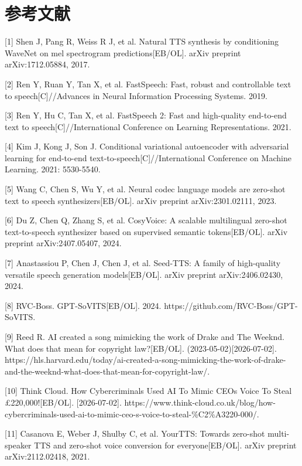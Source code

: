 \chapter*{参考文献}
\begin{referencesblock}
{[}1{]} Shen J, Pang R, Weiss R J, et al. Natural TTS synthesis by
conditioning WaveNet on mel spectrogram predictions{[}EB/OL{]}. arXiv
preprint arXiv:1712.05884, 2017.

{[}2{]} Ren Y, Ruan Y, Tan X, et al. FastSpeech: Fast, robust and
controllable text to speech{[}C{]}//Advances in Neural Information
Processing Systems. 2019.

{[}3{]} Ren Y, Hu C, Tan X, et al. FastSpeech 2: Fast and high-quality
end-to-end text to speech{[}C{]}//International Conference on Learning
Representations. 2021.

{[}4{]} Kim J, Kong J, Son J. Conditional variational autoencoder with
adversarial learning for end-to-end text-to-speech{[}C{]}//International
Conference on Machine Learning. 2021: 5530-5540.

{[}5{]} Wang C, Chen S, Wu Y, et al. Neural codec language models are
zero-shot text to speech synthesizers{[}EB/OL{]}. arXiv preprint
arXiv:2301.02111, 2023.

{[}6{]} Du Z, Chen Q, Zhang S, et al. CosyVoice: A scalable multilingual
zero-shot text-to-speech synthesizer based on supervised semantic
tokens{[}EB/OL{]}. arXiv preprint arXiv:2407.05407, 2024.

{[}7{]} Anastassiou P, Chen J, Chen J, et al. Seed-TTS: A family of
high-quality versatile speech generation models{[}EB/OL{]}. arXiv
preprint arXiv:2406.02430, 2024.

{[}8{]} RVC-Boss. GPT-SoVITS{[}EB/OL{]}. 2024.
https://github.com/RVC-Boss/GPT-SoVITS.

{[}9{]} Reed R. AI created a song mimicking the work of Drake and The
Weeknd. What does that mean for copyright law?{[}EB/OL{]}.
(2023-05-02){[}2026-07-02{]}.
https://hls.harvard.edu/today/ai-created-a-song-mimicking-the-work-of-drake-and-the-weeknd-what-does-that-mean-for-copyright-law/.

{[}10{]} Think Cloud. How Cybercriminals Used AI To Mimic
CEO\textquotesingle s Voice To Steal £220,000!{[}EB/OL{]}.
{[}2026-07-02{]}.
https://www.think-cloud.co.uk/blog/how-cybercriminals-used-ai-to-mimic-ceo-s-voice-to-steal-\%C2\%A3220-000/.

{[}11{]} Casanova E, Weber J, Shulby C, et al. YourTTS: Towards
zero-shot multi-speaker TTS and zero-shot voice conversion for
everyone{[}EB/OL{]}. arXiv preprint arXiv:2112.02418, 2021.


\end{referencesblock}
